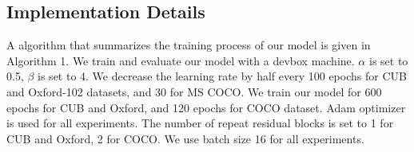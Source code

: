 \documentclass[10pt,twocolumn,letterpaper]{article}
\begin{document}
\subsection{Implementation Details}
A algorithm that summarizes the training process of our model is given in Algorithm 1. We train and evaluate our model with a devbox machine. $\alpha$ is set to 0.5, $\beta$ is set to 4. We decrease the learning rate by half every 100 epochs for CUB and Oxford-102 datasets, and 30 for MS COCO. We train our model for 600 epochs for CUB and Oxford, and 120 epochs for COCO dataset. Adam optimizer is used for all experiments.
The number of repeat residual blocks is set to 1 for CUB and Oxford, 2 for COCO. We use batch size 16 for all experiments. 

\end{document}
